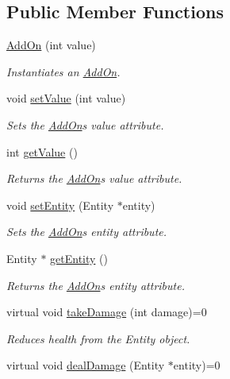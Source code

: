 \subsection*{Public Member Functions}
\begin{DoxyCompactItemize}
\item 
\hyperlink{classAddOn_a64f23691b6c7fc49b6584f8f761ce4d9}{Add\+On} (int value)
\begin{DoxyCompactList}\small\item\em Instantiates an \hyperlink{classAddOn}{Add\+On}. \end{DoxyCompactList}\item 
void \hyperlink{classAddOn_a19f4fe81bd1f0491764e52b48a0b3e63}{set\+Value} (int value)
\begin{DoxyCompactList}\small\item\em Sets the \hyperlink{classAddOn}{Add\+On}\textquotesingle{}s value attribute. \end{DoxyCompactList}\item 
int \hyperlink{classAddOn_a776b1f929793e8387cb0b58fc7aba2c2}{get\+Value} ()
\begin{DoxyCompactList}\small\item\em Returns the \hyperlink{classAddOn}{Add\+On}\textquotesingle{}s value attribute. \end{DoxyCompactList}\item 
void \hyperlink{classAddOn_ac9f4263e3558015fdad46adefceed197}{set\+Entity} (Entity $\ast$entity)
\begin{DoxyCompactList}\small\item\em Sets the \hyperlink{classAddOn}{Add\+On}\textquotesingle{}s entity attribute. \end{DoxyCompactList}\item 
Entity $\ast$ \hyperlink{classAddOn_aaf2f3af4104c7cb69ac67766790ce393}{get\+Entity} ()
\begin{DoxyCompactList}\small\item\em Returns the \hyperlink{classAddOn}{Add\+On}\textquotesingle{}s entity attribute. \end{DoxyCompactList}\item 
virtual void \hyperlink{classAddOn_ab3aefbc00969fe613ed6d42c4f55c5a2}{take\+Damage} (int damage)=0
\begin{DoxyCompactList}\small\item\em Reduces health from the Entity object. \end{DoxyCompactList}\item 
virtual void \hyperlink{classAddOn_aff1f4fa0fb368bbc49838df9c9ddba9c}{deal\+Damage} (Entity $\ast$entity)=0

\end{DoxyCompactItemize}
